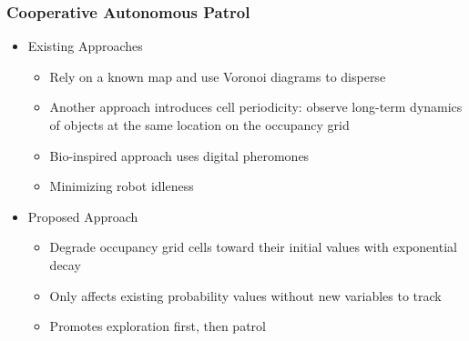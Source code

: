 \documentclass[11pt,professionalfonts,hyperref={pdftex,pdfpagemode=none,pdfstartview=FitH}]{beamer}
\begin{document}
%
%
%
%


\begin{frame}
\frametitle{Cooperative Autonomous Patrol}

\begin{itemize}
	\item Existing Approaches
	\begin{itemize}
		\item Rely on a known map and use Voronoi diagrams to disperse
		\item Another approach introduces cell periodicity: observe long-term dynamics of objects at the same location on the occupancy grid
		\item Bio-inspired approach uses digital pheromones 
		\item Minimizing robot idleness
	\end{itemize}
	\item Proposed Approach
	\begin{itemize}
		\item Degrade occupancy grid cells toward their initial values with exponential decay
		\item Only affects existing probability values without new variables to track
		\item Promotes exploration first, then patrol
	\end{itemize}
\end{itemize}

\end{frame}
\end{document}
